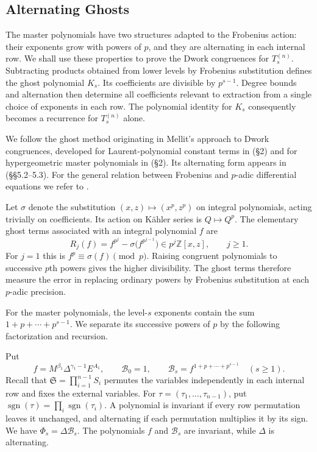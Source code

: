 \documentclass[11pt]{amsart}
\theoremstyle{definition}
\theoremstyle{remark}
\numberwithin{equation}{section}
\newcommand{\Z}{\mathbb Z}
\begin{document}
\subsection{Alternating Ghosts}
The master polynomials have two structures adapted to the
Frobenius action: their exponents grow with powers of $p$, and
they are alternating in each internal row. We shall use these
properties to prove the Dwork congruences for $T_s^{(n)}$.
Subtracting products obtained from lower levels by Frobenius
substitution defines the ghost polynomial $K_s$. Its coefficients
are divisible by $p^{s-1}$. Degree bounds and alternation then
determine all coefficients relevant to extraction from a single
choice of exponents in each row. The polynomial identity for
$K_s$ consequently becomes a recurrence for $T_s^{(n)}$ alone.

We follow the ghost method originating in Mellit's approach to
Dwork congruences, developed for Laurent-polynomial constant terms
in \cite{MV16} (\S2) and for hypergeometric master polynomials in
\cite{VZ24} (\S2). Its alternating form appears in \cite{SV23}
(\S\S5.2--5.3). For the general relation between Frobenius and
$p$-adic differential equations we refer to \cite{Ked10}.

Let $\sigma$ denote the substitution $(x,z)\mapsto(x^p,z^p)$ on
integral polynomials, acting trivially on coefficients. Its action
on K\"ahler series is $Q\mapsto Q^p$. The elementary ghost terms
associated with an integral polynomial $f$ are
\[
 R_j(f)=f^{p^j}-\sigma\bigl(f^{p^{j-1}}\bigr)
       \in p^j\Z[x,z],\qquad j\geq1.
\]
For $j=1$ this is $f^p\equiv\sigma(f)\pmod p$.
Raising congruent polynomials to successive $p$th powers gives the
higher divisibility. The ghost terms therefore measure the error
in replacing ordinary powers by Frobenius substitution at each
$p$-adic precision.

For the master polynomials, the level-$s$ exponents contain the
sum $1+p+\cdots+p^{s-1}$. We separate its successive powers of
$p$ by the following factorization and recursion.

Put
\begin{equation}\label{ar:bar-Phi}
 f=M^{\beta_1}\Delta^{\gamma_1-1}E^{A_1},\qquad
 \mathcal B_0=1,\qquad
 \mathcal B_s=f^{1+p+\cdots+p^{s-1}}\quad(s\geq1).
\end{equation}
Recall that $\mathfrak S=\prod_{i=1}^{n-1}S_i$ permutes the
variables independently in each internal row and fixes the
external variables. For $\tau=(\tau_1,\ldots,\tau_{n-1})$, put
$\operatorname{sgn}(\tau)=\prod_i\operatorname{sgn}(\tau_i)$.
A polynomial is invariant if every row permutation leaves it
unchanged, and alternating if each permutation multiplies it by
its sign.
We have $\Phi_s=\Delta\mathcal B_s$. The polynomials $f$ and
$\mathcal B_s$ are invariant, while $\Delta$ is alternating.
\end{document}
